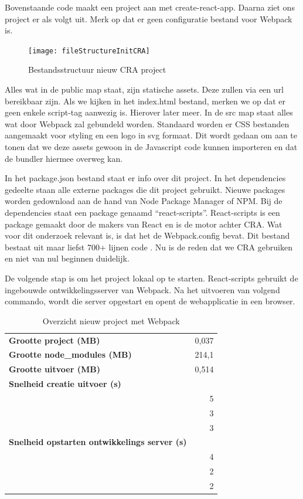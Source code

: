 

Bovenstaande code maakt een project aan met create-react-app. Daarna ziet ons project er als volgt uit. Merk op dat er geen configuratie bestand voor Webpack is.

\begin{figure}[h]
\texttt{[image: fileStructureInitCRA]}
   \centering
   \caption{Bestandsstructuur nieuw CRA project}
\end{figure}

Alles wat in de public map staat, zijn statische assets. Deze zullen via een url bereikbaar zijn. Als we kijken in het index.html bestand, merken we op dat er geen enkele script-tag aanwezig is. Hierover later meer.
In de src map staat alles wat door Webpack zal gebundeld worden. Standaard worden er CSS bestanden aangemaakt voor styling en een logo in svg formaat. Dit wordt gedaan om aan te tonen dat we deze assets gewoon in de Javascript code kunnen importeren en dat de bundler hiermee overweg kan.



In het package.json bestand staat er info over dit project. In het dependencies gedeelte staan alle externe packages die dit project gebruikt. Nieuwe packages worden gedownload aan de hand van Node Package Manager of NPM. Bij de dependencies staat een package genaamd “react-scripts”.
React-scripts \autocite{facebook-2018} is een package gemaakt door de makers van React en is de motor achter CRA.
Wat voor dit onderzoek relevant is, is dat het de Webpack.config bevat. Dit bestand bestaat uit maar liefst 700+ lijnen code \autocite{facebook-2021}. Nu is de reden dat we CRA gebruiken en niet van nul beginnen duidelijk.

De volgende stap is om het project lokaal op te starten. React-scripts gebruikt de ingebouwde ontwikkelingsserver van Webpack. Na het uitvoeren van volgend commando, wordt die server opgestart en opent de webapplicatie in een browser.



\begin{table}[h]
   \centering
   \begin{tabular}{lr}
   \textbf{Grootte project (MB)} & 0,037 \\
   \textbf{Grootte node\_modules (MB)} & 214,1 \\
   \textbf{Grootte uitvoer (MB)} & 0,514 \\
   \textbf{Snelheid creatie uitvoer (s)} & \\
   \textbf{} & 5 \\
   \textbf{} & 3 \\
   \textbf{} & 3 \\
   \textbf{Snelheid opstarten ontwikkelings server (s)} &  \\
   \textbf{} & 4 \\
   \textbf{} & 2 \\
   \textbf{} & 2
   \end{tabular}
   \caption{Overzicht nieuw project met Webpack}
   \end{table}

